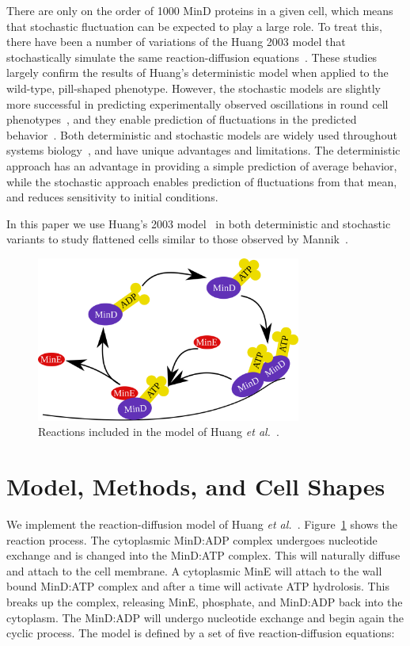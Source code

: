 \documentclass{pnastwo}
\begin{document}
\begin{article}
There are only on the order of 1000 MinD proteins in a given cell,
which means that stochastic fluctuation can be expected to play a
large role.  To treat this, there have been a number of variations of
the Huang 2003 model that stochastically simulate the same
reaction-diffusion equations~\cite{fange2006noise, kerr2006division}.
These studies largely confirm the results of Huang's deterministic
model when applied to the wild-type, pill-shaped phenotype.  However,
the stochastic models are slightly more successful in predicting
experimentally observed oscillations in round cell
phenotypes~\cite{fange2006noise, huang2004min}, and they enable
prediction of fluctuations in the predicted
behavior~\cite{kruse2007experimentalist}.  Both deterministic and
stochastic models are widely used throughout systems
biology~\cite{lawson2013spatial, robb2014stochastic,
  oguz2014stochastic, fu2013deterministic, rudiger2014stochastic}, and
have unique advantages and limitations.  The deterministic approach
has an advantage in providing a simple prediction of average behavior,
while the stochastic approach enables prediction of fluctuations from
that mean, and reduces sensitivity to initial conditions.

In this paper we use Huang's 2003 model~\cite{huang2003dynamic} in
both deterministic and stochastic variants to study flattened cells
similar to those observed by Mannik~\cite{mannik2009bacterial}.

\begin{figure}
  \includegraphics[width=8.7cm]{reactions}
  \caption{Reactions included in the model of Huang \emph{et
      al.}~\cite{huang2003dynamic}.}\label{fig:reactions}
\end{figure}


\section{Model, Methods, and Cell Shapes}\label{sec:model-method-shapes}
We implement the reaction-diffusion model of Huang \emph{et
  al.}~\cite{huang2003dynamic}.  Figure~\ref{fig:reactions} shows the
reaction process.  The cytoplasmic MinD:ADP complex undergoes
nucleotide exchange and is changed into the MinD:ATP complex.  This
will naturally diffuse and attach to the cell membrane.  A cytoplasmic
MinE will attach to the wall bound MinD:ATP complex and after a time
will activate ATP hydrolosis.  This breaks up the complex, releasing
MinE, phosphate, and MinD:ADP back into the cytoplasm.  The MinD:ADP
will undergo nucleotide exchange and begin again the cyclic process.
The model is defined by a set of five reaction-diffusion equations:


\end{article}
\end{document}
